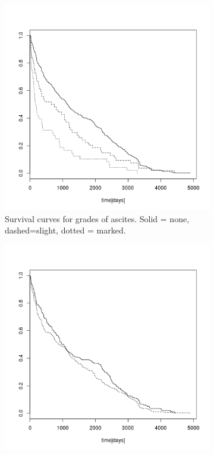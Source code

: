 \documentclass[a4paper]{article}
\begin{document}
\begin{figure}
 \begin{subfigure}{.5\textwidth}
  \includegraphics[width=\textwidth]{asc.png}
  \caption{Survival curves for grades of ascites. Solid = none, dashed=slight, dotted = marked.}
  \label{asc}
 \end{subfigure}
 \begin{subfigure}{.5\textwidth}
  \includegraphics[width=\textwidth]{sex.png}

\end{subfigure}
\end{figure}
\end{document}
